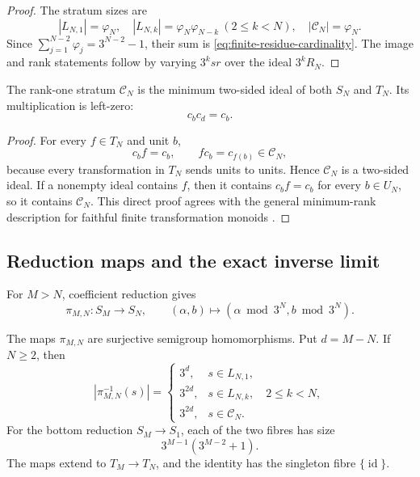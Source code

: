 \begin{proof}
The stratum sizes are
\[
 |L_{N,1}|=\varphi_N,
 \quad |L_{N,k}|=\varphi_N\varphi_{N-k}\ (2\leq k<N),
 \quad |\mathcal C_N|=\varphi_N.
\]
Since $\sum_{j=1}^{N-2}\varphi_j=3^{N-2}-1$, their sum is
\eqref{eq:finite-residue-cardinality}.  The image and rank statements follow
by varying $3^ksr$ over the ideal $3^kR_N$.
\end{proof}

\begin{proposition}
\label{prop:finite-residue-minimum-ideal}
The rank-one stratum $\mathcal C_N$ is the minimum two-sided ideal of both
$S_N$ and $T_N$.  Its multiplication is left-zero:
\[
 c_bc_d=c_b.
\]
\end{proposition}

\begin{proof}
For every $f\in T_N$ and unit $b$,
\[
 c_bf=c_b,
 \qquad fc_b=c_{f(b)}\in\mathcal C_N,
\]
because every transformation in $T_N$ sends units to units.  Hence
$\mathcal C_N$ is a two-sided ideal.  If a nonempty ideal contains $f$, then
it contains $c_bf=c_b$ for every $b\in U_N$, so it contains
$\mathcal C_N$.  This direct proof agrees with the general minimum-rank
description for faithful finite transformation monoids
\cite[Proposition 13.1 and Lemma 13.2]{Steinberg2016}.
\end{proof}

\subsection{Reduction maps and the exact inverse limit}

For $M>N$, coefficient reduction gives
\[
 \pi_{M,N}:S_M\longrightarrow S_N,
 \qquad (\alpha,b)\longmapsto
       (\alpha\bmod3^N,b\bmod3^N).
\]

\begin{theorem}
\label{thm:finite-residue-reduction-fibres}
The maps $\pi_{M,N}$ are surjective semigroup homomorphisms.  Put $d=M-N$.
If $N\geq2$, then
\begin{equation}
\label{eq:finite-residue-general-fibres}
 |\pi_{M,N}^{-1}(s)|=
 \begin{cases}
  3^d,&s\in L_{N,1},\\
  3^{2d},&s\in L_{N,k},\quad2\leq k<N,\\
  3^{2d},&s\in\mathcal C_N.
 \end{cases}
\end{equation}
For the bottom reduction $S_M\to S_1$, each of the two fibres has size
\[
 3^{M-1}(3^{M-2}+1).
\]
The maps extend to $T_M\to T_N$, and the identity has the singleton fibre
$\{\operatorname{id}\}$.
\end{theorem}

